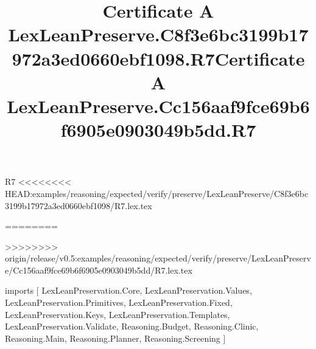 \begin{lexlean}{R7}
<<<<<<<< HEAD:examples/reasoning/expected/verify/preserve/LexLeanPreserve/C8f3e6bc3199b17972a3ed0660ebf1098/R7.lex.tex
\title{Certificate A LexLeanPreserve.C8f3e6bc3199b17972a3ed0660ebf1098.R7}
========
\title{Certificate A LexLeanPreserve.Cc156aaf9fce69b6f6905e0903049b5dd.R7}
>>>>>>>> origin/release/v0.5:examples/reasoning/expected/verify/preserve/LexLeanPreserve/Cc156aaf9fce69b6f6905e0903049b5dd/R7.lex.tex
\begin{coremodule}
imports [
  LexLeanPreservation.Core,
  LexLeanPreservation.Values,
  LexLeanPreservation.Primitives,
  LexLeanPreservation.Fixed,
  LexLeanPreservation.Keys,
  LexLeanPreservation.Templates,
  LexLeanPreservation.Validate,
  Reasoning.Budget,
  Reasoning.Clinic,
  Reasoning.Main,
  Reasoning.Planner,
  Reasoning.Screening
]


\end{coremodule}
\end{lexlean}
